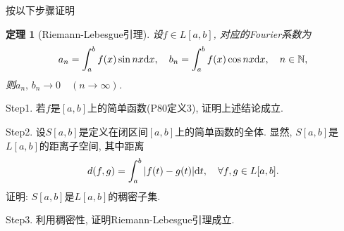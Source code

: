 \documentclass[UTF8,oneside,12pt]{article}  %
\theoremstyle{DingLi1}
\numberwithin{equation}{section}
\newtheorem{theorem}{\hspace{2em}定理}[section]
\theoremstyle{DingLi2}
\newtheorem{example}{\hskip 2em 问题}[section]
\begin{document}
\begin{example}
按以下步骤证明
   \begin{theorem}[Riemann-Lebesgue引理] 设$f\in L[a,b]$, 对应的Fourier系数为
   $$a_n=\int_a^b f(x)\sin nx {\rm d}x,\quad  b_n=\int_a^b f(x)\cos nx {\rm d}x,\quad n\in \Bbb{N},$$
    则$a_n,\,b_n\to 0 \quad (n\to\infty)$.
\end{theorem}
Step1. 若$f$是$[a,b]$上的简单函数(P80定义3), 证明上述结论成立.

Step2. 设$S[a,b]$是定义在闭区间$[a,b]$上的简单函数的全体. 显然, $S[a,b]$是$L[a,b]$的距离子空间, 其中距离
       $$d(f,g)=\int_a^b |f(t)-g(t)|{\rm d}t,\quad \forall f,g\in L[a,b].$$
    证明: $S[a,b]$是$L[a,b]$的稠密子集.

Step3. 利用稠密性, 证明Riemann-Lebesgue引理成立.
\end{example}
\end{document}
